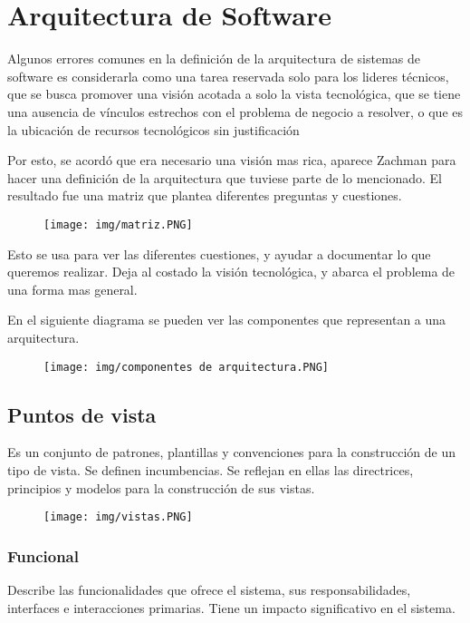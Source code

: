 \section{Arquitectura de Software}
Algunos errores comunes en la definición de la arquitectura de sistemas de software es considerarla como una tarea reservada solo para los lideres técnicos,
que se busca promover una visión acotada a solo la vista tecnológica, que se tiene una ausencia de vínculos estrechos con el problema de negocio a resolver, o que es la ubicación de recursos tecnológicos sin justificación

Por esto, se acordó que era necesario una visión mas rica, aparece Zachman para hacer una definición de la arquitectura que tuviese parte de lo mencionado. El resultado fue una matriz que plantea diferentes preguntas y cuestiones.

\begin{figure}[!htb]
    \centering
    \texttt{[image: img/matriz.PNG]}
\end{figure}

Esto se usa para ver las diferentes cuestiones, y ayudar a documentar lo que queremos realizar. Deja al costado la visión tecnológica, y abarca el problema de una forma mas
general.

En el siguiente diagrama se pueden ver las componentes que representan a una arquitectura.

\begin{figure}[!htb]
    \centering
    \texttt{[image: img/componentes de arquitectura.PNG]}
\end{figure}


\newpage
\subsection*{Puntos de vista}
Es un conjunto de patrones, plantillas y convenciones para la construcción de un tipo de vista. Se definen incumbencias. Se reflejan en ellas las directrices, principios y modelos para la construcción de sus vistas.

\begin{figure}[!htb]
    \centering
    \texttt{[image: img/vistas.PNG]}
\end{figure}


\subsubsection*{Funcional}
Describe las funcionalidades que ofrece el sistema, sus responsabilidades, interfaces e interacciones primarias. Tiene un impacto significativo en el sistema.

